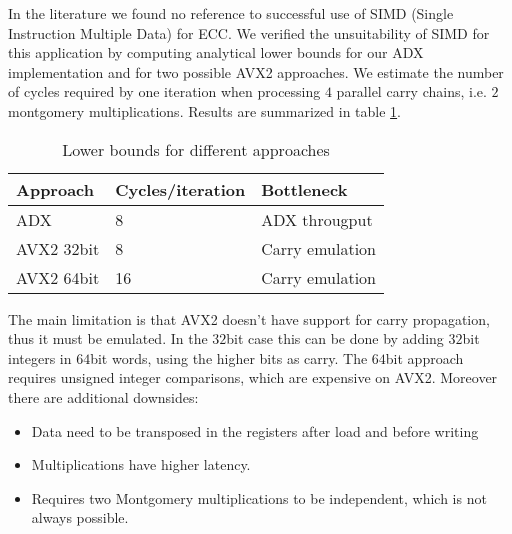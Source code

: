In the literature we found no reference to successful use of SIMD (Single Instruction Multiple Data) for ECC. We verified the unsuitability of SIMD for this application by computing analytical lower bounds for our ADX implementation and for two possible AVX2 approaches.
We estimate the number of cycles required by one iteration when processing $4$ parallel carry chains, i.e. $2$ montgomery multiplications. Results are summarized in table \ref{tbl-adx-avx2}.

\begin{table}
\centering
\caption{Lower bounds for different approaches}
\label{tbl-adx-avx2}
\begin{tabular}{ l l l}
	\hline
 	Approach & Cycles/iteration & Bottleneck \\ \hline
 	ADX & 8 & ADX througput \\
  	AVX2 32bit & 8 & Carry emulation \\
 	AVX2 64bit & 16 & Carry emulation \\ \hline
\end{tabular}
\end{table}

The main limitation is that AVX2 doesn't have support for carry propagation, thus it must be emulated. In the $32$bit case this can be done by adding $32$bit integers in $64$bit words, using the higher bits as carry. The $64$bit approach requires unsigned integer comparisons, which are expensive on AVX2. Moreover there are additional downsides:
\begin{itemize}
\item Data need to be transposed in the registers after load and before writing 
\item Multiplications have higher latency.
\item Requires two Montgomery multiplications to be independent, which is not always possible.
\end{itemize}
